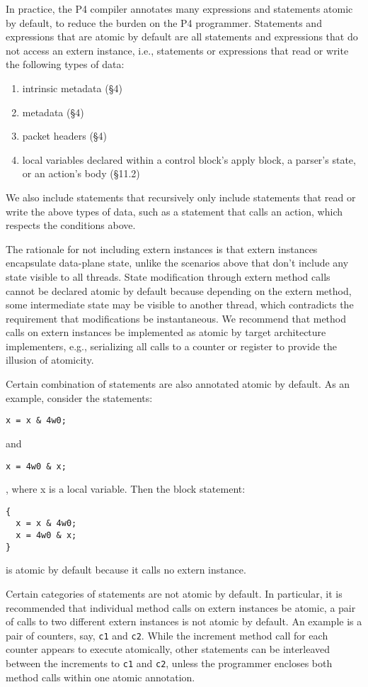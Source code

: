 In practice, the P4 compiler annotates many expressions and statements atomic
 by default, to reduce the burden on the P4 programmer.
Statements and expressions that are atomic by default are all statements and
expressions that do not access an extern instance, i.e., statements or
expressions that read or write the following types of data:
\begin{enumerate}
\item intrinsic metadata (\S4)
\item metadata (\S4)
\item packet headers (\S4)
\item local variables declared within a control block's apply block, a parser's
state, or an action's body (\S11.2)
\end{enumerate}
We also include statements that recursively only include statements that read
or write the above types of data, such as a statement that calls an action,
which respects the conditions above.

The rationale for not including extern instances is that extern instances
encapsulate data-plane state, unlike the scenarios above that don't include any
state visible to all threads. State modification through extern method calls
cannot be declared atomic by default because depending on the extern method,
some intermediate state may be visible to another thread, which contradicts the
requirement that modifications be instantaneous. We recommend that method calls
on extern instances be implemented as atomic by target architecture
implementers, e.g., serializing all calls to a counter or register to provide
the illusion of atomicity.

Certain combination of statements are also annotated atomic by default. As an
example, consider the statements:
\begin{verbatim}
x = x & 4w0;
\end{verbatim}

and
\begin{verbatim}
x = 4w0 & x;
\end{verbatim},
where x is a local variable. Then the block statement:

\begin{verbatim}
{
  x = x & 4w0;
  x = 4w0 & x;
}
\end{verbatim}
is atomic by default because it calls no extern instance.

Certain categories of statements are not atomic by default. In particular, it
is recommended that individual method calls on extern instances be atomic, a
pair of calls to two different extern instances is not atomic by default. An
example is a pair of counters, say, \texttt{c1} and \texttt{c2}. While the
increment method call for each counter appears to execute atomically, other
statements can be interleaved between the increments to \texttt{c1} and
\texttt{c2}, unless the programmer encloses both method calls within one atomic
annotation.

